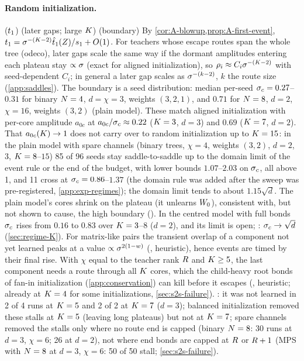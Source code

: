 \paragraph{Random initialization.} \derived{} ($t_{1}$) \conjecture{} (later gaps; large $K$) \empirical{}
(boundary) By \cref{cor:A-blowup,prop:A-first-event}, $t_{1}=\sigma^{-(K-2)}\hat t_1(Z)/s_{1}+O(1)$. For teachers whose
escape routes span the whole tree (odeco), later gaps scale the same way if the dormant amplitudes
entering each plateau stay $\propto\sigma$ (exact for aligned initialization), so $\rho_{i}\approx C_i\sigma^{-(K-2)}$ with
seed-dependent $C_i$; in general a later gap scales as $\sigma^{-(k-2)}$, $k$ the route size (\cref{app:saddles}).
The boundary is a seed distribution: median per-seed $\sigma_c=0.27$--$0.31$ for binary $N=4$, $d=\chi=3$, weights
$(3,2,1)$, and $0.71$ for $N=8$, $d=2$, $\chi=16$, weights $(3,2)$ (plain model). These match aligned initialization
with per-core amplitude $a_{0c}$ at $a_{0c}/\sigma_c\approx0.22$ ($K=3$, $d=3$) and $0.69$ ($K=7$, $d=2$). That
$a_{0c}(K)\to1$ does not carry over to random initialization up to $K=15$: in the plain model with spare
channels (binary trees, $\chi=4$, weights $(3,2)$, $d=2$, $3$, $K=8$--$15$) 85 of 96 seeds stay saddle-to-saddle
up to the domain limit of the event rule or the end of the budget, with lower bounds $1.07$--$2.03$ on $\sigma_c$, all
above 1, and 11 cross at $\sigma_c=0.86$--$1.37$ \empirical{} (the domain rule was added after the sweep was
pre-registered, \cref{app:exp-regimes}); the domain limit tends to about $1.15\sqrt d$. The plain
model's cores shrink on the plateau (it unlearns $W_{0}$), consistent with, but not shown to cause, the high
boundary (\conjecture). In the centred model with full bonds $\sigma_c$ rises from $0.16$ to $0.83$ over $K=3$--$8$
($d=2$), and its limit is open; \conjecture: $\sigma_c\to\sqrt d$ (\cref{sec:regime-K}). For matrix-like pairs the transient
overlap of a component not yet learned peaks at a value $\propto\sigma^{2(1-w)}$ (\conjecture, heuristic), hence
events are timed by their final rise. With $\chi$ equal to the teacher rank $R$ and $K\ge5$, the last
component needs a route through all $K$ cores, which the child-heavy root bonds of fan-in
initialization (\cref{app:conservation}) can kill before it escapes (\conjecture, heuristic; already at $K=4$
for some initializations, \cref{sec:s2s-failure}). \empirical: it was not learned in 2 of 4 runs at $K=5$ and 2
of 2 at $K=7$ ($d=3$); balanced initialization removed these stalls at $K=5$ (leaving long plateaus) but not
at $K=7$; spare channels removed the stalls only where no route end is capped (binary $N=8$: 30 runs at
$d=3$, $\chi=6$; 26 at $d=2$), not where end bonds are capped at $R$ or $R+1$ (MPS with $N=8$ at $d=3$,
$\chi=6$: 50 of 50 stall; \cref{sec:s2s-failure}).

